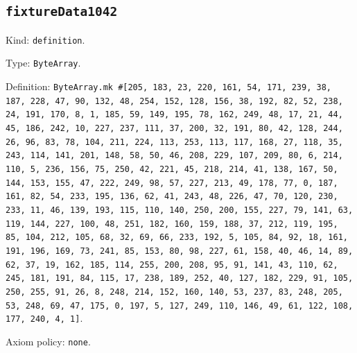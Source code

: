 \documentclass[11pt]{article}
\begin{document}
\subsection*{\texttt{fixtureData1042}}
\noindent Kind: \texttt{definition}.\par
\noindent Type: \texttt{ByteArray}.\par
\noindent Definition: \texttt{ByteArray.mk \#[205, 183, 23, 220, 161, 54, 171, 239, 38, 187, 228, 47, 90, 132, 48, 254, 152, 128, 156, 38, 192, 82, 52, 238, 24, 191, 170, 8, 1, 185, 59, 149, 195, 78, 162, 249, 48, 17, 21, 44, 45, 186, 242, 10, 227, 237, 111, 37, 200, 32, 191, 80, 42, 128, 244, 26, 96, 83, 78, 104, 211, 224, 113, 253, 113, 117, 168, 27, 118, 35, 243, 114, 141, 201, 148, 58, 50, 46, 208, 229, 107, 209, 80, 6, 214, 110, 5, 236, 156, 75, 250, 42, 221, 45, 218, 214, 41, 138, 167, 50, 144, 153, 155, 47, 222, 249, 98, 57, 227, 213, 49, 178, 77, 0, 187, 161, 82, 54, 233, 195, 136, 62, 41, 243, 48, 226, 47, 70, 120, 230, 233, 11, 46, 139, 193, 115, 110, 140, 250, 200, 155, 227, 79, 141, 63, 119, 144, 227, 100, 48, 251, 182, 160, 159, 188, 37, 212, 119, 195, 85, 104, 212, 105, 68, 32, 69, 66, 233, 192, 5, 105, 84, 92, 18, 161, 191, 196, 169, 73, 241, 85, 153, 80, 98, 227, 61, 158, 40, 46, 14, 89, 62, 37, 19, 162, 185, 114, 255, 200, 208, 95, 91, 141, 43, 110, 62, 245, 181, 191, 84, 115, 17, 238, 189, 252, 40, 127, 182, 229, 91, 105, 250, 255, 91, 26, 8, 248, 214, 152, 160, 140, 53, 237, 83, 248, 205, 53, 248, 69, 47, 175, 0, 197, 5, 127, 249, 110, 146, 49, 61, 122, 108, 177, 240, 4, 1]}.\par
\noindent Axiom policy: \texttt{none}.\par
\end{document}
